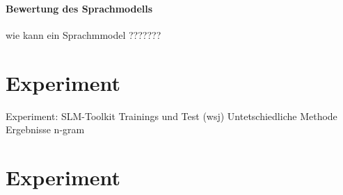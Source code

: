 		\subsubsection{Bewertung des Sprachmodells}
			
wie kann ein Sprachmmodel ???????

\chapter{Experiment}
\label{chapter:Experiment}

	Experiment:
		SLM-Toolkit
		Trainings und Test (wsj)
		Untetschiedliche Methode
		Ergebnisse
		   n-gram
		   
\chapter{Experiment}
\label{chapter:Experiment}
 
